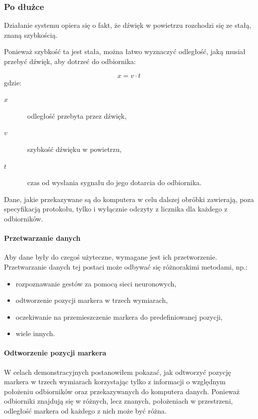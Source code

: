 \subsubsection{Po dłużce}
Działanie systemu opiera się o fakt, że dźwięk w powietrzu rozchodzi się ze stałą, znaną szybkością.

Ponieważ szybkość ta jest stała, można łatwo wyznaczyć odległość, jaką musiał przebyć dźwięk, aby dotrzeć do odbiornika:

\begin{equation}
 x = v \cdot t
 \label{eq:sound_distance}
\end{equation}
gdzie:
\begin{description}
 \item[$x$] \ppauza~odległość przebyta przez dźwięk,
 \item[$v$] \ppauza~szybkość dźwięku w powietrzu,
 \item[$t$] \ppauza~czas od wysłania sygnału do jego dotarcia do odbiornika. 
\end{description}

Dane, jakie przekazywane są do komputera w celu dalszej obróbki zawierają, poza specyfikacją protokołu, tylko i wyłącznie odczyty z licznika dla każdego z odbiorników.

\paragraph{Przetwarzanie danych}
Aby dane były do czegoś użyteczne, wymagane jest ich przetworzenie. Przetwarzanie danych tej postaci może odbywać się różnorakimi metodami, np.:
\begin{itemize}
 \item rozpoznawanie gestów za pomocą sieci neuronowych,
 \item odtworzenie pozycji markera w trzech wymiarach,
 \item oczekiwanie na przemieszczenie markera do predefiniowanej pozycji,
 \item wiele innych.
\end{itemize}

\paragraph{Odtworzenie pozycji markera}
W celach demonstracyjnych postanowiłem pokazać, jak odtworzyć pozycję markera w trzech wymiarach korzystając tylko z informacji o względnym położeniu odbiorników oraz przekazywanych do komputera danych.
\newline
\newline
Ponieważ odbiorniki znajdują się w różnych, lecz znanych, położeniach w przestrzeni, odległość markera od każdego z nich może być różna.

